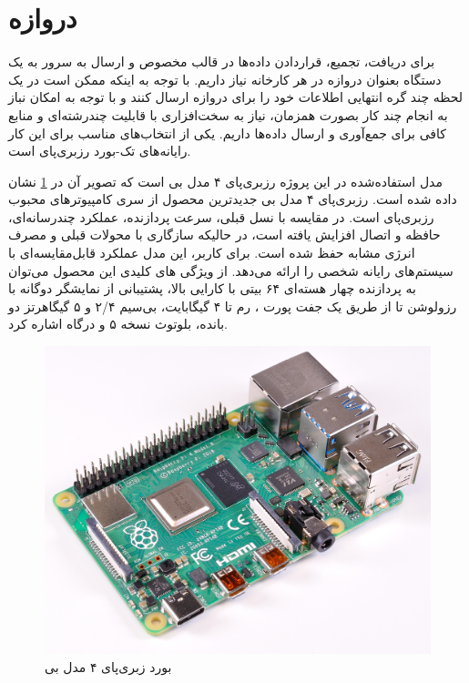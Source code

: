 \section{دروازه}

برای دریافت، تجمیع، قراردادن داده‌ها در قالب مخصوص و ارسال به سرور به یک دستگاه بعنوان دروازه در هر کارخانه نیاز داریم. با توجه به اینکه ممکن است در یک لحظه چند گره انتهایی اطلاعات خود را برای دروازه ارسال کنند و با توجه به امکان نباز به انجام چند کار بصورت همزمان، نیاز به سخت‌افزاری با قابلیت چند‌رشته‌ای و منابع کافی برای جمع‌آوری و ارسال داده‌ها داریم. یکی از انتخاب‌های مناسب برای این کار رایانه‌های تک-بورد رزبری‌پای است.

مدل استفاده‌شده در این پروژه رزبری‌پای ۴ مدل بی است که تصویر آن در \cref{fig:raspberry_pi} نشان داده شده است. رزبری‌پای ۴ مدل بی جدیدترین محصول از سری کامپیوترهای محبوب رزبری‌پای است. در مقایسه با نسل قبلی، سرعت پردازنده، عملکرد چندرسانه‌ای، حافظه و اتصال افزایش یافته است، در حالیکه سازگاری با محولات قبلی و مصرف انرژی مشابه حفظ شده است. برای کاربر، این مدل عملکرد قابل‌مقایسه‌ای با سیستم‌های رایانه شخصی  را ارائه می‌دهد. از ویژگی های کلیدی این محصول می‌توان به پردازنده چهار هسته‌ای ۶۴ بیتی با کارایی بالا، پشتیبانی از نمایشگر دوگانه با رزولوشن تا  از طریق یک جفت پورت ، رم تا ۴ گیگابایت، بی‌سیم ۲/۴ و ۵ گیگاهرتز دو بانده، بلوتوث نسخه ۵ و درگاه  اشاره کرد\cite{raspberry}.

\begin{figure}[!h]
\centering\includegraphics[scale=.2]{raspberry_pi.png}
\caption{بورد زبری‌پای ۴ مدل بی}\label{fig:raspberry_pi}
\end{figure}


